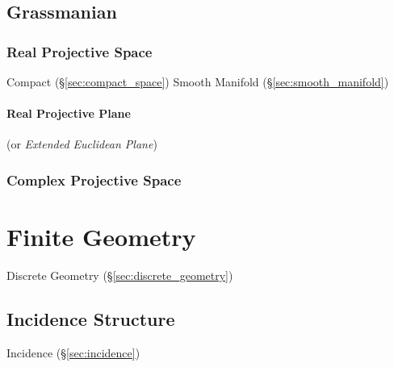 \subsection{Grassmanian}\label{sec:grassmanian}

\subsubsection{Real Projective Space}\label{sec:real_projective_space}

Compact (\S\ref{sec:compact_space}) Smooth Manifold
(\S\ref{sec:smooth_manifold})



\paragraph{Real Projective Plane}\label{sec:real_projective_plane}\hfill

(or \emph{Extended Euclidean Plane})



\subsubsection{Complex Projective Space}
\label{sec:complex_projective_space}



\section{Finite Geometry}\label{sec:finite_geometry}

\fist Discrete Geometry (\S\ref{sec:discrete_geometry})



\subsection{Incidence Structure}\label{sec:incidence_structure}

Incidence (\S\ref{sec:incidence})



